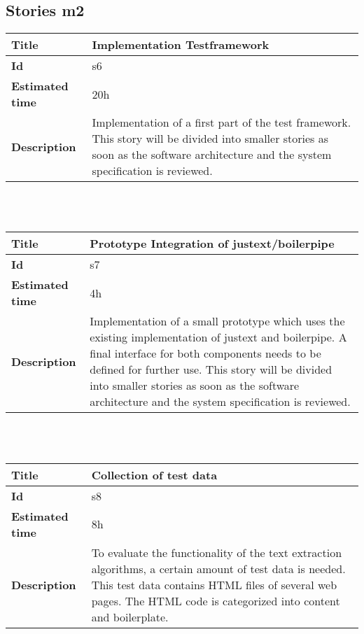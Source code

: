 \subsection {Stories m2}


    \begin{tabular}{ | p{4cm} | p{10cm} |}
    \hline
    \textbf{Title} & Implementation Testframework \\ \hline
    \textbf{Id} & s6\\ \hline
    \textbf{Estimated time} & 20h \\ \hline
    \textbf{Description} & Implementation of a first part of the test framework. This story will be divided into smaller stories as soon as the software architecture and the system specification is reviewed.\\ 
    \hline
    \end{tabular} \\\\


    \begin{tabular}{ | p{4cm} | p{10cm} |}
    \hline
    \textbf{Title} & Prototype Integration of justext/boilerpipe\\ \hline
    \textbf{Id} & s7\\ \hline
    \textbf{Estimated time} & 4h \\ \hline
    \textbf{Description} &  Implementation of a small prototype which uses the existing implementation of justext and boilerpipe. A final interface for both components needs to be defined for further use.
    This story will be divided into smaller stories as soon as the software architecture and the system specification is reviewed.\\ 
    \hline
    \end{tabular} \\\\

    \begin{tabular}{ | p{4cm} | p{10cm} |}
    \hline
    \textbf{Title} & Collection of test data\\ \hline
    \textbf{Id} & s8\\ \hline
    \textbf{Estimated time} & 8h \\ \hline
    \textbf{Description} &  To evaluate the functionality of the text extraction algorithms, a certain amount of test data is needed. This test data contains HTML files of several web pages. The HTML code is categorized into content and boilerplate.\\ 
    \hline
    \end{tabular} \\\\




